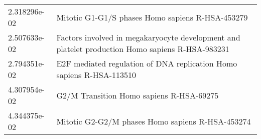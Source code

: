 \begin{longtable}{p{2.4cm}p{14.5cm}}
             2.318296e-02 &                                                                                                       Mitotic G1-G1/S phases Homo sapiens R-HSA-453279 \\
             2.507633e-02 &                                                        Factors involved in megakaryocyte development and platelet production Homo sapiens R-HSA-983231 \\
             2.794351e-02 &                                                                                   E2F mediated regulation of DNA replication Homo sapiens R-HSA-113510 \\
             4.307954e-02 &                                                                                                               G2/M Transition Homo sapiens R-HSA-69275 \\
             4.344375e-02 &                                                                                                       Mitotic G2-G2/M phases Homo sapiens R-HSA-453274 \\
\end{longtable}



